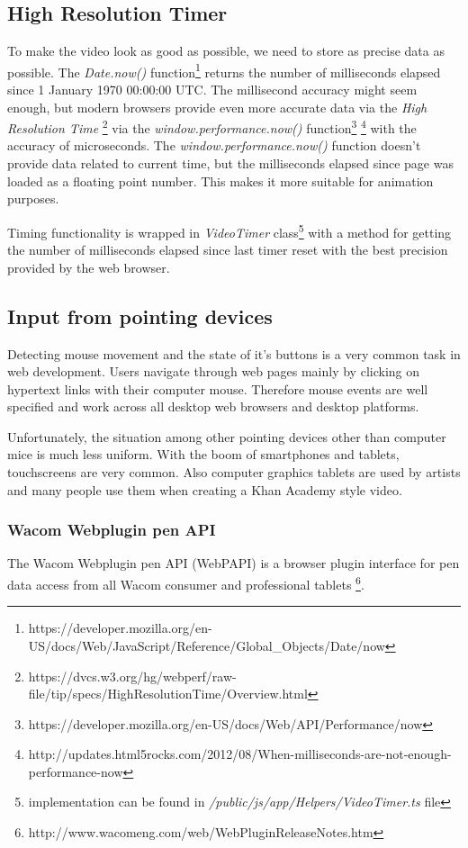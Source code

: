 \subsection{High Resolution Timer}
To make the video look as good as possible, we need to store as precise data as possible. The \textit{Date.now()} function\footnote{https://developer.mozilla.org/en-US/docs/Web/JavaScript/Reference/Global\_Objects/Date/now} returns the number of milliseconds elapsed since 1 January 1970 00:00:00 UTC. The millisecond accuracy might seem enough, but modern browsers provide even more accurate data via the \textit{High Resolution Time} \footnote{https://dvcs.w3.org/hg/webperf/raw-file/tip/specs/HighResolutionTime/Overview.html} via the \textit{window.performance.now()} function\footnote{https://developer.mozilla.org/en-US/docs/Web/API/Performance/now} \footnote{http://updates.html5rocks.com/2012/08/When-milliseconds-are-not-enough-performance-now} with the accuracy of microseconds. The \textit{window.performance.now()} function doesn't provide data related to current time, but the milliseconds elapsed since page was loaded as a floating point number. This makes it more suitable for animation purposes.

Timing functionality is wrapped in \textit{VideoTimer} class\footnote{implementation can be found in \textit{/public/js/app/Helpers/VideoTimer.ts} file} with a method for getting the number of milliseconds elapsed since last timer reset with the best precision provided by the web browser.

\subsection{Input from pointing devices}

Detecting mouse movement and the state of it's buttons is a very common task in web development. Users navigate through web pages mainly by clicking on hypertext links with their computer mouse. Therefore mouse events are well specified and work across all desktop web browsers and desktop platforms.

Unfortunately, the situation among other pointing devices other than computer mice is much less uniform. With the boom of smartphones and tablets, touchscreens are very common. Also computer graphics tablets are used by artists and many people use them when creating a Khan Academy style video.

\subsubsection{Wacom Webplugin pen API}
The Wacom Webplugin pen API (WebPAPI) is a browser plugin interface for pen data access from all Wacom consumer and professional tablets \cite{}\footnote{http://www.wacomeng.com/web/WebPluginReleaseNotes.htm}.

